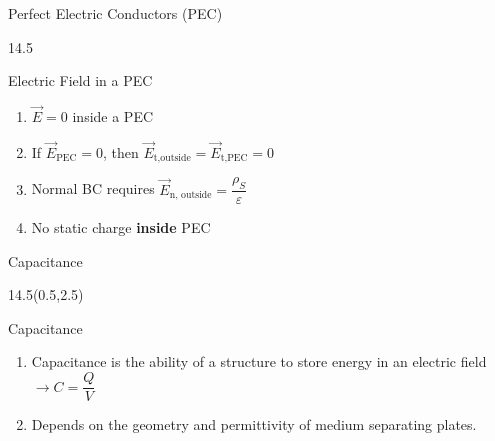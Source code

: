 \begin{lesson24}
\begin{frame}{Perfect Electric Conductors (PEC)}
\begin{textblock}{14.5}
\begin{center}
{
} %
\end{center}
\vspace{-12pt}
\begin{myblock}[0.9]{Electric Field in a PEC}
	\begin{enumerate}
		\item $\vec{E} = 0 $ inside a PEC 
		\item If $\vec{E}_{\text{PEC}} = 0$, then $\vec{E}_{\text{t,outside}} = \vec{E}_{\text{t,PEC}} = 0$
		\item Normal BC requires $\vec{E}_{\text{n, outside}} = \dfrac{\rho_S}{\varepsilon}$
		\item No static charge \textbf{inside} PEC  
	\end{enumerate}
\end{myblock}


\end{textblock}
\end{frame}

\begin{frame}{Capacitance}
\begin{textblock}{14.5}(0.5,2.5)
\begin{myblock}[0.9]{Capacitance}
\begin{enumerate}
	\item Capacitance is the ability of a structure to store energy in an electric field $\longrightarrow C = \dfrac{Q}{V}$
	\item Depends on the geometry and permittivity of medium separating plates.
\end{enumerate}
\end{myblock}
\vspace{-12pt}
\begin{small}
\alert{
} %
\end{small}
\end{textblock}
\end{frame}



\end{lesson24}
